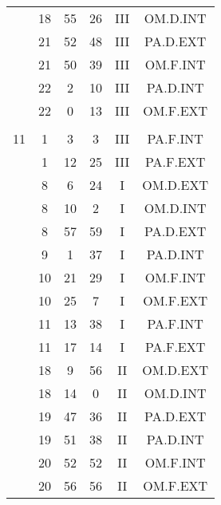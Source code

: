 \documentclass[12pt, a4paper]{article}
\begin{document}
\begin{multicols}{3}
{\begin{tabular}{c c c c c c}
	 	 	 	 & 18 & 55 & 26 & III & OM.D.INT\\%
	 	 	 	 & 21 & 52 & 48 & III & PA.D.EXT\\%
	 	 	 	 & 21 & 50 & 39 & III & OM.F.INT\\%
	 	 	 	 & 22 & 2 & 10 & III & PA.D.INT\\%
	 	 	 	 & 22 & 0 & 13 & III & OM.F.EXT\\%
	 	 	 	 & & & & & \\%
	 	 	 	11 & 1 & 3 & 3 & III & PA.F.INT\\%
	 	 	 	 & 1 & 12 & 25 & III & PA.F.EXT\\%
	 	 	 	 & 8 & 6 & 24 & I & OM.D.EXT\\%
	 	 	 	 & 8 & 10 & 2 & I & OM.D.INT\\%
	 	 	 	 & 8 & 57 & 59 & I & PA.D.EXT\\%
	 	 	 	 & 9 & 1 & 37 & I & PA.D.INT\\%
	 	 	 	 & 10 & 21 & 29 & I & OM.F.INT\\%
	 	 	 	 & 10 & 25 & 7 & I & OM.F.EXT\\%
	 	 	 	 & 11 & 13 & 38 & I & PA.F.INT\\%
	 	 	 	 & 11 & 17 & 14 & I & PA.F.EXT\\%
	 	 	 	 & 18 & 9 & 56 & II & OM.D.EXT\\%
	 	 	 	 & 18 & 14 & 0 & II & OM.D.INT\\%
	 	 	 	 & 19 & 47 & 36 & II & PA.D.EXT\\%
	 	 	 	 & 19 & 51 & 38 & II & PA.D.INT\\%
	 	 	 	 & 20 & 52 & 52 & II & OM.F.INT\\%
	 	 	 	 & 20 & 56 & 56 & II & OM.F.EXT\\%
	 	 \end{tabular}
 	}
\end{multicols}
\end{document}
